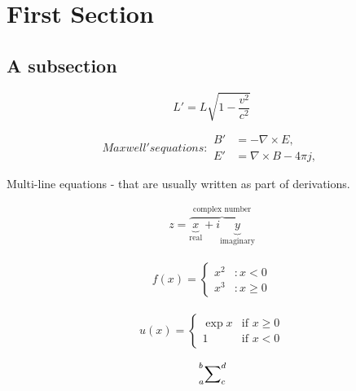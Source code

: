 \documentclass[12pt]{article}
\numberwithin{equation}{subsection}
\begin{document}
 \section{First Section}

 \subsection{A subsection}
 \begin{equation}
  L' = {L}{\sqrt{1-\frac{v^2}{c^2}}}
 \end{equation}
 
 \begin{subequations}
Maxwell's equations:
\begin{align}
        B'&=-\nabla \times E,\\
        E'&=\nabla \times B - 4\pi j,
\end{align}
\end{subequations}

Multi-line equations - that are usually written as part of derivations.

\begin{align}
z = \overbrace{
   \underbrace{x}_\text{real} + i
   \underbrace{y}_\text{imaginary}
  }^\text{complex number}
\end{align}

\begin{align*}
f(x) = \left\{
  \begin{array}{lr}
    x^2 & : x < 0\\
    x^3 & : x \ge 0
  \end{array}
\right.
\end{align*}

\begin{align*}
u(x) =
  \begin{cases}
   \exp{x} & \text{if } x \geq 0 \\
   1       & \text{if } x < 0
  \end{cases}
\end{align*}

\begin{align*}
\sideset{_a^b}{_c^d}\sum
\end{align*}
\end{document}
